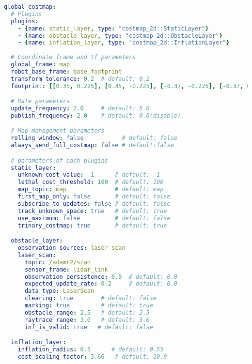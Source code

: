 \documentclass[{../../master}]{subfiles}
\begin{document}
\begin{lstlisting}[language=YAML, label=code:global_costmap_yml, caption=\textsf{global\_costmap.yml}]
global_costmap:
  # Plugins
  plugins:
    - {name: static_layer, type: "costmap_2d::StaticLayer"}
    - {name: obstacle_layer, type: "costmap_2d::ObstacleLayer"}
    - {name: inflation_layer, type: "costmap_2d::InflationLayer"}
  
  # Coordinate frame and tf parameters
  global_frame: map
  robot_base_frame: base_footprint
  transform_tolerance: 0.2  # default: 0.2
  footprint: [[0.35, 0.225], [0.35, -0.225], [-0.37, -0.225], [-0.37, 0.225]]

  # Rate parameters
  update_frequency: 2.0     # default: 5.0
  publish_frequency: 2.0    # default: 0.0(disable)

  # Map management parameters
  rolling_window: false           # default: false
  always_send_full_costmap: false # default:false

  # parameters of each plugins
  static_layer:
    unknown_cost_value: -1      # default: -1
    lethal_cost_threshold: 100  # default: 100
    map_topic: map              # default: map
    first_map_only: false       # default: false
    subscribe_to_updates: false # default: false
    track_unknown_space: true   # default: true
    use_maximum: false          # default: false
    trinary_costmap: true       # default: true

  obstacle_layer:
    observation_sources: laser_scan
    laser_scan:
      topic: /adamr2/scan
      sensor_frame: lidar_link
      observation_persistence: 0.0  # default: 0.0
      expected_update_rate: 0.2     # default: 0.0
      data_type: LaserScan
      clearing: true        # default: false
      marking: true         # default: true
      obstacle_range: 2.5   # default: 2.5
      raytrace_range: 3.0   # default: 3.0
      inf_is_valid: true   # default: false

  inflation_layer:
    inflation_radius: 0.5      # default: 0.55
    cost_scaling_factor: 3.66   # default: 10.0
\end{lstlisting}
\end{document}
